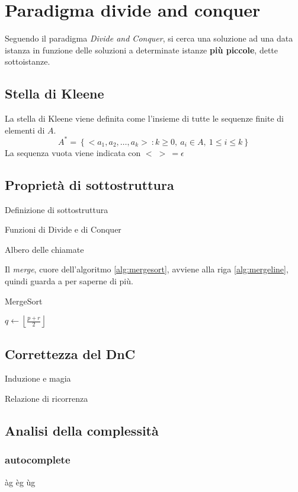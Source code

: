 \section{Paradigma divide and conquer}

Seguendo il paradigma \textit{Divide and Conquer}, si cerca una soluzione ad una data istanza in funzione delle soluzioni a determinate istanze \textbf{più piccole}, dette sottoistanze.

\subsection{Stella di Kleene}
\begin{definition}\label{def:kleene}
    La stella di Kleene viene definita come l'insieme di tutte le sequenze finite di elementi di $A$.
    $$ A^* = \left\{ < a_1, a_2, \dots, a_k > \: : k \geq 0, \: a_i \in A, \: 1 \leq i \leq k \right\}$$
    La sequenza vuota viene indicata con $ < \; > \: = \epsilon $
\end{definition}
\subsection{Proprietà di sottostruttura}

Definizione di sottostruttura

Funzioni di Divide e di Conquer

Albero delle chiamate

Il \textit{merge}, cuore dell'algoritmo \ref{alg:mergesort}, avviene alla riga \ref{alg:mergeline}, quindi guarda a  per saperne di più.

\begin{algorithm}[h]
\caption{MergeSort}\label{alg:mergesort}
\begin{algorithmic}[1]
        \State $ q \gets \left\lfloor \frac{p+r}{2} \right\rfloor $ 
        \State {} 
        \State {} 
        \State
            \label{alg:mergeline}
    \EndIf
    \EndProcedure
\end{algorithmic}
\end{algorithm}

\subsection{Correttezza del DnC}

Induzione e magia

Relazione di ricorrenza

\subsection{Analisi della complessità}

\subsubsection{autocomplete}

àg
èg
ùg
